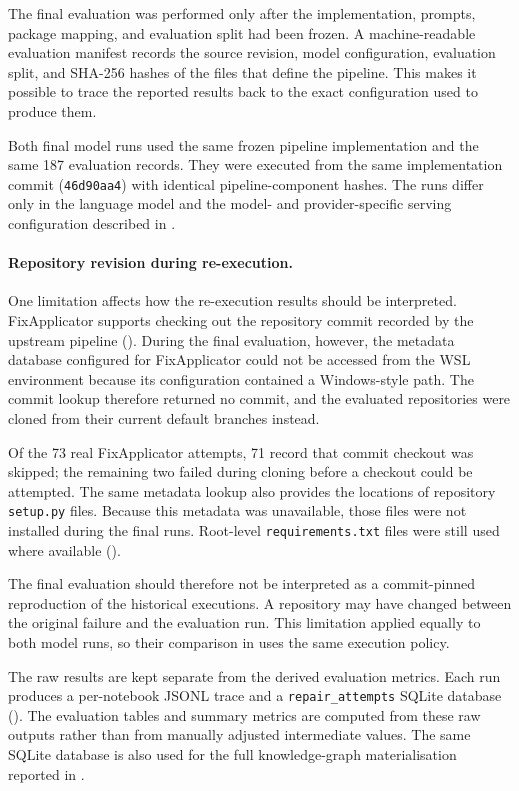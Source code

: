 The final evaluation was performed only after the implementation, prompts,
package mapping, and evaluation split had been frozen. A machine-readable
evaluation manifest records the source revision, model configuration, evaluation
split, and SHA-256 hashes of the files that define the pipeline. This makes it
possible to trace the reported results back to the exact configuration used to
produce them.

Both final model runs used the same frozen pipeline implementation and the same
187 evaluation records. They were executed from the same implementation commit
(\texttt{46d90aa4}) with identical pipeline-component hashes. The runs differ only
in the language model and the model- and provider-specific serving configuration
described in .

\paragraph{Repository revision during re-execution.}
One limitation affects how the re-execution results should be interpreted.
FixApplicator supports checking out the repository commit recorded by the upstream
pipeline (). During the final evaluation, however, the
metadata database configured for FixApplicator could not be accessed from the WSL
environment because its configuration contained a Windows-style path. The commit
lookup therefore returned no commit, and the evaluated repositories were cloned
from their current default branches instead.

Of the 73 real FixApplicator attempts, 71 record that commit checkout was skipped;
the remaining two failed during cloning before a checkout could be attempted. The
same metadata lookup also provides the locations of repository
\texttt{setup.py} files. Because this metadata was unavailable, those files were not
installed during the final runs. Root-level \texttt{requirements.txt} files were still
used where available ().

The final evaluation should therefore not be interpreted as a commit-pinned
reproduction of the historical executions. A repository may have changed between
the original failure and the evaluation run. This limitation applied equally to both
model runs, so their comparison in  uses the same
execution policy.

The raw results are kept separate from the derived evaluation metrics. Each run
produces a per-notebook JSONL trace and a \texttt{repair\_attempts} SQLite database
(). The evaluation tables and summary metrics are computed
from these raw outputs rather than from manually adjusted intermediate values. The
same SQLite database is also used for the full knowledge-graph materialisation
reported in .

